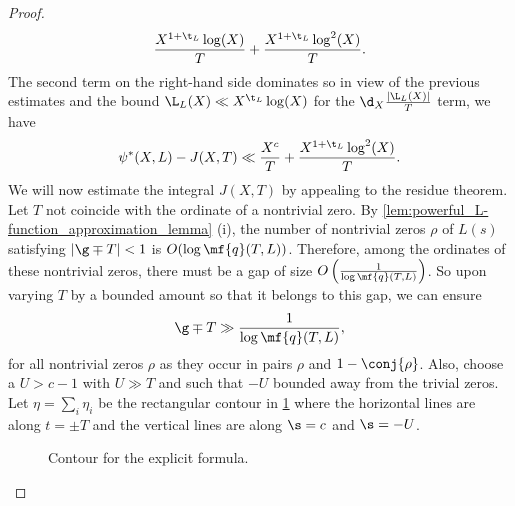 \documentclass[12pt]{article}
\begin{document}
\begin{proof}
\[          \frac{X^{1+\t_{L}}\log(X)}{T}+\frac{X^{1+\t_{L}}\log^{2}(X)}{T}.
        \]
        The second term on the right-hand side dominates so in view of the previous estimates and the bound \(\L_{L}(X) \ll X^{\t_{L}}\log(X)\) for the \(\d_{X}\frac{|\L_{L}(X)|}{T}\) term, we have
        \[
          \psi^{\ast}(X,L)-J(X,T) \ll \frac{X^{c}}{T}+\frac{X^{1+\t_{L}}\log^{2}(X)}{T}.
        \]
        We will now estimate the integral \(J(X,T)\) by appealing to the residue theorem. Let \(T\) not coincide with the ordinate of a nontrivial zero. By \cref{lem:powerful_L-function_approximation_lemma} (i), the number of nontrivial zeros \(\rho\) of \(L(s)\) satisfying \(|\g\mp T| < 1\) is \(O(\log\mf{q}(T,L))\). Therefore, among the ordinates of these nontrivial zeros, there must be a gap of size \(O\left(\frac{1}{\log\mf{q}(T,L)}\right)\). So upon varying \(T\) by a bounded amount so that it belongs to this gap, we can ensure
        \[
          \g\mp T \gg \frac{1}{\log\mf{q}(T,L)},
        \]
        for all nontrivial zeros \(\rho\) as they occur in pairs \(\rho\) and \(1-\conj{\rho}\). Also, choose a \(U > c-1\) with \(U \gg T\) and such that \(-U\) bounded away from the trivial zeros. Let \(\eta = \sum_{i}\eta_{i}\) be the rectangular contour in \cref{fig:explict_formula_contour} where the horizontal lines are along \(t = \pm T\) and the vertical lines are along \(\s = c\) and \(\s = -U\).

        \begin{figure}[h]
          \centering
          \caption{Contour for the explicit formula.}
          \label{fig:explict_formula_contour}
        \end{figure}


\end{proof}
\end{document}
